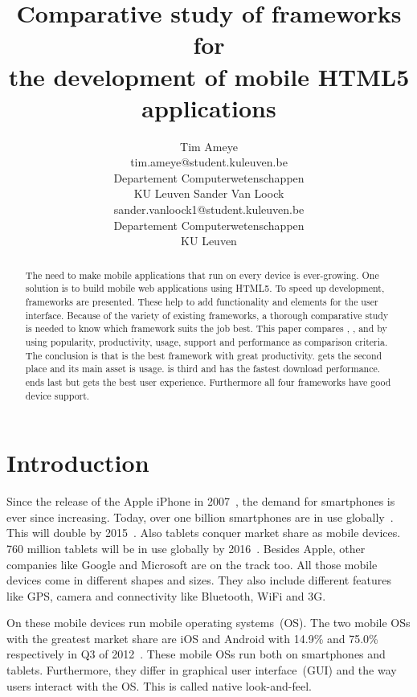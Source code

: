 \documentclass[a4paper]{artikel3}
\title{Comparative study of frameworks for \\ the development of mobile HTML5 applications}
\author{Tim Ameye \\ tim.ameye@student.kuleuven.be \\ Departement Computerwetenschappen \\ KU Leuven \And Sander Van Loock \\ sander.vanloock1@student.kuleuven.be \\ Departement Computerwetenschappen \\ KU Leuven}
\begin{document}
\maketitle

\begin{abstract}
The need to make mobile applications that run on every device is ever-growing.
One solution is to build mobile web applications using HTML5.
To speed up development,  frameworks are presented.
These help to add functionality and elements for the user interface.
Because of the variety of existing frameworks, a thorough comparative study is needed to know which framework suits the job best.
This paper compares \st{}, \jqm{}, \kendo{} and \lungo{} by using popularity, productivity, usage, support and performance as comparison criteria. 
The conclusion is that \jqm{} is the best framework with great productivity. 
\kendo{} gets the second place and its main asset is usage.
\lungo{} is third and has the fastest download performance.
\st{} ends last but gets the best user experience.
Furthermore all four frameworks have good device support.
\end{abstract}


\section{Introduction} %
\label{sec:introduction}
Since the release of the Apple iPhone in 2007~\cite{David2011}, the demand for smartphones is ever since increasing. 
Today, over one billion smartphones are in use globally~\cite{Yang2012}.
This will double by 2015~\cite{Gillett2012}.
Also tablets conquer market share as mobile devices.
760 million tablets will be in use globally by 2016~\cite{Gillett2012}.
Besides Apple, other companies like Google and Microsoft are on the track too.
All those mobile devices come in different shapes and sizes.
They also include different features like GPS, camera and connectivity like Bluetooth, WiFi and 3G.

On these mobile devices run mobile operating systems~(OS). 
The two mobile OSs with the greatest market share are iOS and Android with 14.9\% and 75.0\% respectively in Q3 of 2012~\cite{Protalinski2012}.
These mobile OSs run both on smartphones and tablets.
Furthermore, they differ in graphical user interface~(GUI) and the way users interact with the OS.
This is called native look-and-feel.
\end{document}
